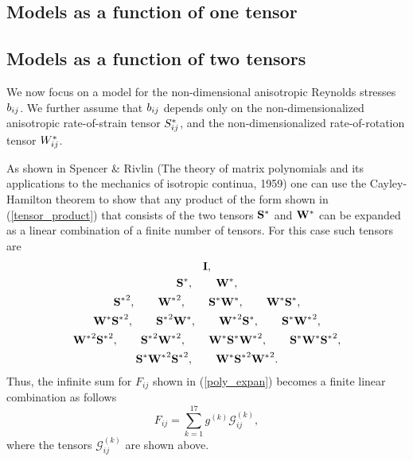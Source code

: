\documentclass[oneside,a4paper,11pt]{report}
\begin{document}
\subsection{Models as a function of one tensor}

\subsection{Models as a function of two tensors}
We now focus on a model for the non-dimensional anisotropic Reynolds stresses $b_{ij}$. We further assume that $b_{ij}$ depends only on the non-dimensionalized anisotropic rate-of-strain tensor $S^*_{ij}$, and the non-dimensionalized rate-of-rotation tensor $W^*_{ij}$. 

As shown in Spencer \& Rivlin (The theory of matrix polynomials and its applications to the mechanics of isotropic continua, 1959) one can use the Cayley-Hamilton theorem to show that any product of the form shown in (\ref{tensor_product}) that consists of  the two tensors $\mathbf{S^*}$ and $\mathbf{W^*}$ can be expanded as a linear combination of a finite number of tensors. For this case such tensors are
\begin{gather}
\mathbf{I}, \nonumber \\
\mathbf{S^*}, \qquad \mathbf{W^*}, \nonumber \\
\mathbf{S^*}^2, \qquad \mathbf{W^*}^2, \qquad \mathbf{S^*} \mathbf{W^*}, \qquad \mathbf{W^*} \mathbf{S^*}, \nonumber \\
\mathbf{W^*} \mathbf{S^*}^2, \qquad \mathbf{S^*}^2 \mathbf{W^*}, \qquad \mathbf{W^*}^2 \mathbf{S^*}, \qquad \mathbf{S^*} \mathbf{W^*}^2, \nonumber \\
\mathbf{W^*}^2 \mathbf{S^*}^2, \qquad \mathbf{S^*}^2 \mathbf{W^*}^2, \qquad \mathbf{W^*} \mathbf{S^*} \mathbf{W^*}^2, \qquad \mathbf{S^*} \mathbf{W^*} \mathbf{S^*}^2, \nonumber \\
\mathbf{S^*} \mathbf{W^*}^2 \mathbf{S^*}^2, \qquad \mathbf{W^*} \mathbf{S^*}^2 \mathbf{W^*}^2.
\end{gather}
Thus, the infinite sum for $F_{ij}$ shown in (\ref{poly_expan}) becomes a finite linear combination as follows
\begin{equation}
\label{rs_algebraic_model}
F_{ij} = \sum_{k = 1}^{17} g^{(k)}\mathcal{G}_{ij}^{(k)},
\end{equation}
where the tensors $\mathcal{G}_{ij}^{(k)}$ are shown above.
\end{document}
